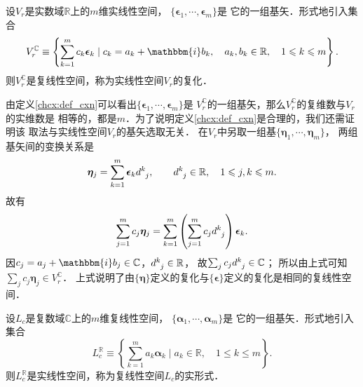 
  
\begin{definition}\label{chcx:def_cxn}
    设$V_r$是实数域$\mathbb{R}$上的$m$维实线性空间，
    $\{\boldsymbol{\epsilon}_1,\cdots,\boldsymbol{\epsilon}_m\}$是
    它的一组基矢．形式地引入集合
    \begin{equation}\label{chcx:eqn_cxn}
        V^{\mathbb{C}}_r \equiv \left\{ \sum_{k=1}^{m} c_k \boldsymbol{\epsilon}_k \mid
        c_k = a_k+\mathbbm{i} b_k,\quad a_k,b_k \in \mathbb{R},
        \quad 1\leqslant k \leqslant m \right\} .
    \end{equation}
    则$V^{\mathbb{C}}_r$是复线性空间，称为实线性空间$V_r$的{\heiti 复化}．
\end{definition}

由定义\ref{chcx:def_cxn}可以看出$\{\boldsymbol{\epsilon}_1,\cdots,\boldsymbol{\epsilon}_m\}$是
$V^{\mathbb{C}}_r$的一组基矢，那么$V^{\mathbb{C}}_r$的{\kaishu 复维数}与$V_r$的{\kaishu 实维数}是
相等的，都是$m$．为了说明定义\ref{chcx:def_cxn}是合理的，我们还需证明该
取法与实线性空间$V_r$的基矢选取无关．
在$V_r$中另取一组基$\{\boldsymbol{\eta}_1,\cdots,\boldsymbol{\eta}_m\}$，
两组基矢间的变换关系是
\begin{equation}
    \boldsymbol{\eta}_j = \sum_{k=1}^{m} \boldsymbol{\epsilon}_k d^k_{\hphantom{k}j},\qquad
    d^k_{\hphantom{k}j} \in \mathbb{R},\quad 1\leqslant j,k \leqslant m .
\end{equation}
故有
\begin{equation}
    \sum_{j=1}^{m} c_j \boldsymbol{\eta}_j = \sum_{k=1}^{m}
    \left( \sum_{j=1}^{m} c_j d^k_{\hphantom{k}j} \right)\boldsymbol{\epsilon}_k .
\end{equation}
因$c_j= a_j+\mathbbm{i} b_j\in \mathbb{C}$，$d^k_{\hphantom{k}j} \in \mathbb{R}$，
故$\sum_{j} c_j d^k_{\hphantom{k}j} \in \mathbb{C}$；
所以由上式可知$\sum_{j} c_j \boldsymbol{\eta}_j \in V^{\mathbb{C}}_r$．
上式说明了由$\{\boldsymbol{\eta}\}$定义的复化与$\{\boldsymbol{\epsilon}\}$定义的复化是相同的复线性空间．


\begin{definition}\label{chcx:def_real}
    设$L_c$是复数域$\mathbb{C}$上的$m$维复线性空间，
    $\{\boldsymbol{\alpha}_1,\cdots,\boldsymbol{\alpha}_m\}$是
    它的一组基矢．形式地引入集合
    \begin{equation}
        L^{\mathbb{R}}_c \equiv \left\{ \sum_{k=1}^{m} a_k \boldsymbol{\alpha}_k \mid
        a_k \in \mathbb{R},     \quad 1\leqslant  k \leqslant m \right\} .
    \end{equation}
    则$L^{\mathbb{R}}_c$是实线性空间，称为复线性空间$L_c$的{\heiti 实形式}．
\end{definition}


